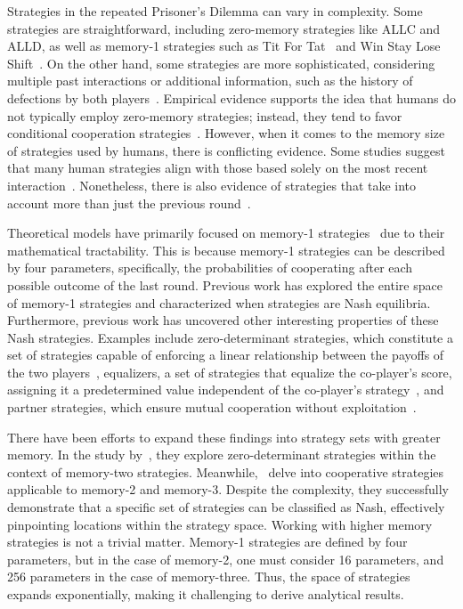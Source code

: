 \documentclass{article}
\theoremstyle{definition}
\begin{document}
Strategies in the repeated Prisoner's Dilemma can vary in complexity. Some
strategies are straightforward, including zero-memory strategies like ALLC and
ALLD, as well as memory-1 strategies such as Tit For
Tat~\cite{axelrod:AAAS:1981} and Win Stay Lose Shift~\cite{nowak:Nature:1993}.
On the other hand, some strategies are more sophisticated, considering multiple
past interactions or additional information, such as the history of defections
by both players~\cite{harper:PLOSONE:2017, knight:PLOSONE:2018,
li:NatureCompSci:2022}.
Empirical evidence supports the idea that humans do not typically employ
zero-memory strategies; instead, they tend to favor conditional cooperation
strategies~\cite{fischbacher:AER:2010, rand:Elsevier:2013,
grujic:ScientificReports:2014}. However, when it comes to the memory size of strategies used
by humans, there is conflicting evidence. Some studies suggest that many human
strategies align with those based solely on the most recent
interaction~\cite{engle:ET:2006, dal:AER:2011, camera:GEB:2012, bruttel:TD:2012}.
Nonetheless, there is also evidence of strategies that
take into account more than just the previous round~\cite{fudenberg:AER:2012, romero:EER:2018}.

Theoretical models have primarily focused on memory-1
strategies~\cite{nowak:Nature:1993, nowak:Nature:1992, glynatsi:scientific:2020, press:PNAS:2012,
stewart:scientific:2016, kraines:elsevier:2000,
imhof:ProceedingsB:2010, baek:scientific:2016, hilbe:PNAS:2013,
chen:PNASnexus:2023, hilbe:Nature:2018, akin:EGADS:2016} due to their
mathematical tractability. This is because memory-1 strategies can be described
by four parameters, specifically, the probabilities of cooperating after each
possible outcome of the last round. Previous work has explored the entire space
of memory-1 strategies and characterized when strategies are Nash equilibria.
Furthermore, previous work has uncovered other interesting properties of these
Nash strategies. Examples include zero-determinant strategies, which constitute
a set of strategies capable of enforcing a linear relationship between the
payoffs of the two players~\cite{press:PNAS:2012}, equalizers, a set of
strategies that equalize the co-player's score, assigning it a predetermined
value independent of the co-player's strategy~\cite{hilbe:PNAS:2013}, and
partner strategies, which ensure mutual cooperation without
exploitation~\cite{hilbe:Nature:2018}.

There have been efforts to expand these findings into strategy sets with
greater memory. In the study by~\cite{ueda:RSOP:2021}, they explore
zero-determinant strategies within the context of
memory-two strategies. Meanwhile,~\cite{hilbe:PNAS:2017} delve into cooperative
strategies applicable to memory-2 and memory-3. Despite the complexity, they
successfully demonstrate that a specific set of strategies can be classified as
Nash, effectively pinpointing locations within the strategy space.
Working with higher memory strategies is not a trivial matter. Memory-1
strategies are defined by four parameters, but in the case of memory-2, one must
consider 16 parameters, and 256 parameters in the case of memory-three. Thus, the
space of strategies expands exponentially, making it challenging to derive
analytical results.
\end{document}
